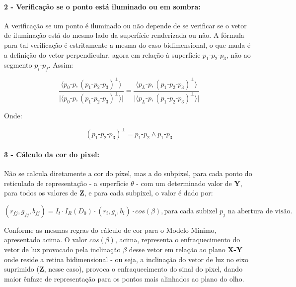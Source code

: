 \documentclass{article}
\begin{document}
	\paragraph{2 - Verificação se o ponto está iluminado ou em sombra:}
	A verificação se um ponto é iluminado ou não depende de se verificar se o vetor de iluminação está do mesmo lado da superfície renderizada ou não. A fórmula para tal verificação é estritamente a mesma do caso bidimensional, o que muda é a definição do vetor perpendicular, agora em relação à superfície $p_1$-$p_2$-$p_3$, não ao segmento $p_i$-$p_f$. Assim:
	
	\begin{equation}
		\frac{\langle p_0\text{-}p , (p_1\text{-}p_2\text{-}p_3)^\bot \rangle}{\lvert \langle p_0\text{-}p , (p_1\text{-}p_2\text{-}p_3)^\bot \rangle \rvert} = \frac{\langle p_L\text{-}p , (p_1\text{-}p_2\text{-}p_3)^\bot \rangle}{\lvert \langle p_L\text{-}p , (p_1\text{-}p_2\text{-}p_3)^\bot \rangle \rvert}
	\end{equation}
	
	Onde:
	
	\begin{equation}
		(p_1\text{-}p_2\text{-}p_3)^\bot = p_1\text{-}p_2 \wedge p_1\text{-}p_3
	\end{equation}
		
	
	\paragraph{3 - Cálculo da cor do pixel:}
	Não se calcula diretamente a cor do píxel, mas a do subpixel, para cada ponto do reticulado de representação - a superfície $\theta$ - com um determinado valor de \textbf{Y}, para todos os valores de \textbf{Z}, e para cada subpixel, o valor é dado por:
	
	\begin{equation}
		(r_{fj}, g_{fj}, b_{fj}) = I_t \cdot I_R(D_0) \cdot (r_i, g_i, b_i) \cdot cos(\beta), \text{para cada subixel $p_j$ na abertura de visão}.
	\end{equation}

	Conforme as mesmas regras do cálculo de cor para o Modelo Mínimo, apresentado acima. O valor $cos(\beta)$, acima, representa o enfraquecimento do vetor de luz provocado pela inclinação $\beta$ desse vetor em relação ao plano \textbf{X-Y} onde reside a retina bidimensional - ou seja, a inclinação do vetor de luz no eixo suprimido (\textbf{Z}, nesse caso), provoca o enfraquecimento do sinal do pixel, dando maior ênfaze de representação para os pontos mais alinhados ao plano do olho.
	
\end{document}
